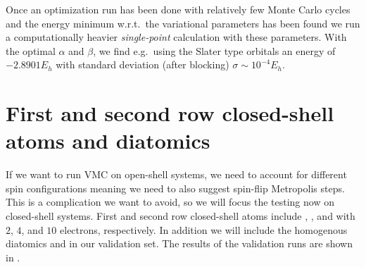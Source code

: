 \documentclass[../../master.tex]{subfiles}
\begin{document}
Once an optimization run has been done  with relatively few Monte Carlo cycles and the energy minimum w.r.t.\ the variational parameters has been found we run a computationally heavier \emph{single-point} calculation with these parameters. With the optimal $\alpha$ and $\beta$, we find e.g.\ using the Slater type orbitals an energy of $-2.8901E_h$ with standard deviation (after blocking) $\sigma\sim10^{-4}E_h$. 

\section{First and second row closed-shell atoms and diatomics}
If we want to run VMC on open-shell systems, we need to account for different spin configurations meaning we need to also suggest spin-flip Metropolis steps. This is a complication we want to avoid, so we will focus the testing now on closed-shell systems. First and second row closed-shell atoms include , , and  with $2$, $4$, and $10$ electrons, respectively. In addition we will include the homogenous diatomics  and  in our validation set. The results of the validation runs are shown in . 
\end{document}
